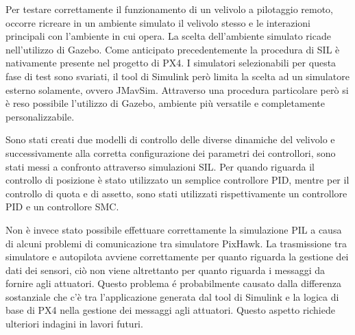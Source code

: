 Per testare correttamente il funzionamento di un velivolo a pilotaggio remoto, occorre ricreare in un ambiente simulato il velivolo stesso e le interazioni principali con l'ambiente in cui opera. La scelta dell'ambiente simulato ricade nell'utilizzo di Gazebo. Come anticipato precedentemente la procedura di SIL è nativamente presente nel progetto di PX4. I simulatori selezionabili per questa fase di test sono svariati, il tool di Simulink però limita la scelta ad un simulatore esterno solamente, ovvero JMavSim. Attraverso una procedura particolare però si è reso possibile l'utilizzo di Gazebo, ambiente più versatile e completamente personalizzabile.

Sono stati creati due modelli di controllo delle diverse dinamiche del velivolo e successivamente alla corretta configurazione dei parametri dei controllori, sono stati messi a confronto attraverso simulazioni SIL. Per quando riguarda il controllo di posizione è stato utilizzato un semplice controllore PID, mentre per il controllo di quota e di assetto, sono stati utilizzati rispettivamente un controllore PID e un controllore SMC. 

Non è invece stato possibile effettuare correttamente la simulazione PIL a causa di alcuni problemi di comunicazione tra simulatore PixHawk. La trasmissione tra simulatore e autopilota avviene correttamente per quanto riguarda la gestione dei dati dei sensori, ciò non viene altrettanto per quanto riguarda i messaggi da fornire agli attuatori. Questo problema é probabilmente causato dalla differenza sostanziale che c'è tra l'applicazione generata dal tool di Simulink e la logica di base di PX4 nella gestione dei messaggi agli attuatori. Questo aspetto richiede ulteriori indagini in lavori futuri.


